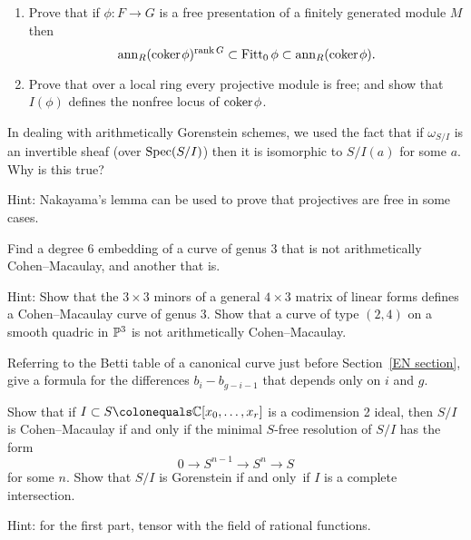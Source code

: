 \begin{exercise}
\begin{enumerate}
\item Prove that if $\phi: F\to G$ is a free presentation of a finitely
generated module $M$
then
$$
{\rm{ann}}_{R}({\rm{coker}\kern1pt} \phi)^{\operatorname{rank} G}\subset \operatorname{Fitt}_{0}\phi \subset
{\rm{ann}}_{R}({\rm{coker}\kern1pt} \phi).
$$
\item Prove that over a local ring every projective module is free;
and show that
$I(\phi)$ defines the nonfree locus of ${\rm{coker}\kern1pt} \phi$.
\end{enumerate}
\end{exercise}

\begin{exercise}
In dealing with arithmetically Gorenstein schemes, we used the fact that
%
if $\omega_{S/I}$ is an invertible
sheaf (over $\operatorname{Spec}(S/I)$) then it is isomorphic to $S/I(a)$ for some
$a$. Why is this true?

Hint: Nakayama's lemma can be used to prove that projectives are free
%
in some cases.
\end{exercise}

\begin{exercise}
Find a degree 6 embedding of a curve of genus 3 that is not arithmetically
Cohen--Macaulay, and another that is.

Hint: Show that the $3\times 3$ minors of a general $4\times 3$ matrix
of linear forms defines a Cohen--Macaulay curve
of genus 3. Show that a curve of type $(2,4)$ on a smooth quadric in
$\mathbb P^3$ is not arithmetically Cohen--Macaulay.
\end{exercise}

\begin{exercise}
Referring to the Betti table of a canonical curve just before
%
Section~\ref{EN section}, give a formula
for the differences $b_i- b_{g-i-1}$ that depends only on $i$ and $g$.
\end{exercise}

\begin{exercise}
Show that if $I \subset S \colonequals  \CC[x_0,\dots, x_r]$ is a
codimension 2 ideal, then $S/I$ is Cohen--Macaulay if and only
if the minimal $S$-free resolution of $S/I$ has the form
$$
0\to S^{n-1} \to S^n \to S
$$
for some $n$. Show that $S/I$ is Gorenstein if and only~if $I$ is a
complete intersection.

Hint: for the first part, tensor with
the field of rational functions.
\end{exercise}

